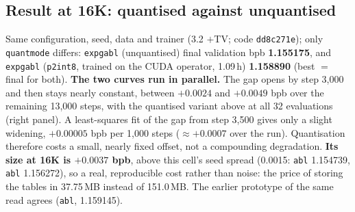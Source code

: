 \documentclass[10pt]{article}
\newcommand{\code}[1]{{\renewcommand{\_}{\textunderscore\allowbreak}\texttt{#1}}}
\begin{document}
\subsection*{Result at 16K: quantised against unquantised}
Same configuration, seed, data and trainer (3.2 $+$TV; code \code{dd8c271e}); only \code{quant\_mode} differs:
\code{exp\_g\_abl\_46} (unquantised) final validation bpb \textbf{1.155175}, and \code{exp\_g\_abl\_48} (\code{p2\_int8}, trained on the CUDA operator, 1.09\,h) \textbf{1.158890}
(best $=$ final for both).
\textbf{The two curves run in parallel.} The gap opens by step 3,000 and then stays nearly constant, between $+0.0024$ and $+0.0049$ bpb over the remaining 13,000 steps,
with the quantised variant above at all 32 evaluations (right panel). A least-squares fit of the gap from step 3,500 gives only a slight widening, $+0.00005$ bpb per 1,000 steps
($\approx+0.0007$ over the run). Quantisation therefore costs a small, nearly fixed offset, not a compounding degradation.
\textbf{Its size at 16K is $+0.0037$ bpb}, above this cell's seed spread (0.0015: \code{abl\_05} 1.154739, \code{abl\_42} 1.156272), so a real, reproducible cost rather than noise:
the price of storing the tables in 37.75\,MB instead of 151.0\,MB.
The earlier prototype of the same read agrees (\code{abl\_45}, 1.159145).
\end{document}
